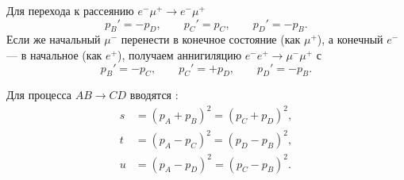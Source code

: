 \documentclass[../final.tex]{subfiles}
\begin{document}
Для перехода к рассеянию $e^-\mu^+\to e^-\mu^+$
\begin{equation*}
    p_B'=-p_D,\qquad p_C'=p_C,\qquad p_D'=-p_B.
\end{equation*}
Если же начальный $\mu^-$ перенести в конечное состояние (как $\mu^+$),
а конечный $e^-$ --- в начальное (как $e^+$), получаем аннигиляцию
$e^-e^+\to\mu^-\mu^+$ с
\begin{equation*}
    p_B'=-p_C,\qquad p_C'=+p_D,\qquad p_D'=-p_B.
\end{equation*}


Для процесса $AB\to CD$ вводятся :
\begin{align*}
    s&=(p_A+p_B)^2=(p_C+p_D)^2,\\
    t&=(p_A-p_C)^2=(p_D-p_B)^2,\\
    u&=(p_A-p_D)^2=(p_C-p_B)^2.
\end{align*}
\end{document}
